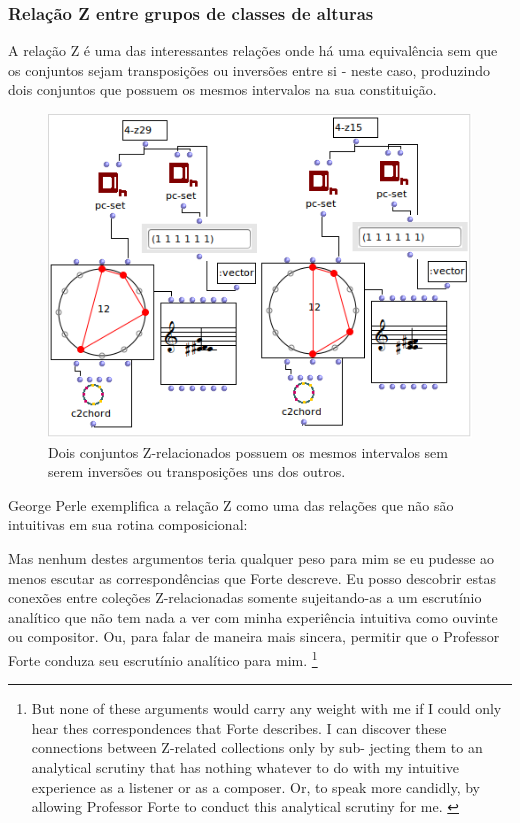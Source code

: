 \documentclass[
	12pt,				%
	openright,			%
	twoside,			%
	a4paper,			%
	english,			%
	french,				%
	spanish,			%
	brazil				%
	]{abntex2}
\begin{document}
\subsubsection{Relação Z entre grupos de classes de alturas}

A relação Z é uma das interessantes relações onde há uma equivalência sem que os conjuntos sejam transposições ou inversões entre si - neste caso, produzindo dois conjuntos que possuem os mesmos intervalos na sua constituição.


\begin{figure}[!h]
	\caption{\label{fig_grafico}Dois conjuntos Z-relacionados possuem os mesmos intervalos sem serem inversões ou transposições uns dos outros. }
	\begin{center}
	    \includegraphics[scale=0.7]{OM_settheory/Z_related.png}
	\end{center}
\end{figure}


George Perle exemplifica a relação Z como uma das relações que não são intuitivas em sua rotina composicional:

\begin{citacao}
Mas nenhum destes argumentos teria qualquer peso para mim se eu pudesse ao menos escutar as correspondências que Forte descreve. Eu posso descobrir estas conexões entre coleções Z-relacionadas somente sujeitando-as a um escrutínio analítico que não tem nada a ver com minha experiência intuitiva como ouvinte ou compositor. Ou, para falar de maneira mais sincera, permitir que o Professor Forte conduza seu escrutínio analítico para mim.
\cite[ p. 168]{perle1990pitch}\footnote{
But none of these arguments would carry any weight with me if
I could only hear thes correspondences that Forte describes. I can
discover these connections between Z-related collections only by sub-
jecting them to an analytical scrutiny that has nothing whatever to do
with my intuitive experience as a listener or as a composer. Or, to
speak more candidly, by allowing Professor Forte to conduct this
analytical scrutiny for me. 
\cite[p.168]{perle1990pitch}}
\end{citacao}
\end{document}
